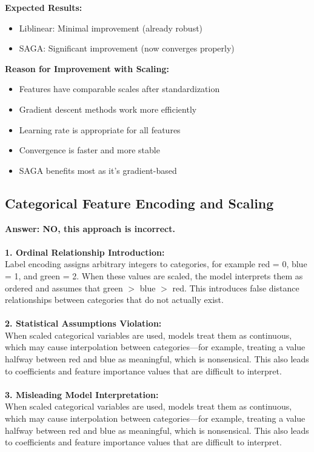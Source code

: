\documentclass[12pt]{article}
\begin{document}
\textbf{Expected Results:}
\begin{itemize}
    \item Liblinear: Minimal improvement (already robust)
    \item SAGA: Significant improvement (now converges properly)
\end{itemize}

\textbf{Reason for Improvement with Scaling:}
\begin{itemize}
    \item Features have comparable scales after standardization
    \item Gradient descent methods work more efficiently
    \item Learning rate is appropriate for all features
    \item Convergence is faster and more stable
    \item SAGA benefits most as it's gradient-based
\end{itemize}

\subsection{Categorical Feature Encoding and Scaling}

\textbf{Answer: NO, this approach is incorrect.}\\
\\
\textbf{1. Ordinal Relationship Introduction:}\\
Label encoding assigns arbitrary integers to categories, for example red = 0, blue = 1, and green = 2. When these values are scaled, the model interprets them as ordered and assumes that green $>$ blue $>$ red. This introduces false distance relationships between categories that do not actually exist.\\
\\
\textbf{2. Statistical Assumptions Violation:}\\
When scaled categorical variables are used, models treat them as continuous, which may cause interpolation between categories—for example, treating a value halfway between red and blue as meaningful, which is nonsensical. This also leads to coefficients and feature importance values that are difficult to interpret.\\
\\
\textbf{3. Misleading Model Interpretation:}\\
When scaled categorical variables are used, models treat them as continuous, which may cause interpolation between categories—for example, treating a value halfway between red and blue as meaningful, which is nonsensical. This also leads to coefficients and feature importance values that are difficult to interpret.\\
\end{document}
